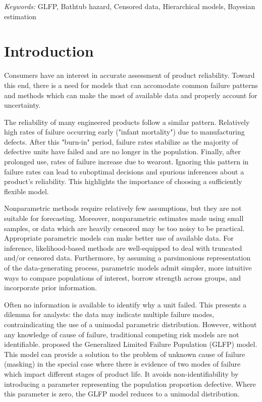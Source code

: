 \documentclass[12pt]{article}
\begin{document}
\noindent%
{\it Keywords:} GLFP, Bathtub hazard, Censored data, Hierarchical models, Bayesian estimation
\vfill

\newpage
\tableofcontents
\newpage
{} %
\section{Introduction}
Consumers have an interest in accurate assessment of product reliability. Toward this end, there is a need for models that can accomodate common failure patterns and methods which can make the most of available data and properly account for uncertainty.

The reliability of many engineered products follow a similar pattern. Relatively high rates of failure occurring early ("infant mortality") due to manufacturing defects.  After this "burn-in" period, failure rates stabilize as the majority of defective units have failed and are no longer in the population.  Finally, after prolonged use, rates of failure increase due to wearout.  Ignoring this pattern in failure rates can lead to suboptimal decisions and spurious inferences about a product's reliability. This highlights the importance of choosing a sufficiently flexible model.

Nonparametric methods require relatively few assumptions, but they are not suitable for forecasting. Moreover, nonparametric estimates made using small samples, or data which are heavily censored may be too noisy to be practical. Appropriate parametric models can make better use of available data. For inference, likelihood-based methods are well-equipped to deal with truncated and/or censored data. Furthermore, by assuming a parsimonious representation of the data-generating process, parametric models admit simpler, more intuitive ways to compare populations of interest, borrow strength across groups, and incorporate prior information. 

Often no information is available to identify why a unit failed. This presents a dilemma for analysts: the data may indicate multiple failure modes, contraindicating the use of a unimodal parametric distribution. However, without any knowledge of cause of failure, traditional competing risk models are not identifiable. \citet{chan} proposed the Generalized Limited Failure Population (GLFP) model. This model can provide a solution to the problem of unknown cause of failure (masking) in the special case where there is evidence of two modes of failure which impact different stages of product life. It avoids non-identifiability by introducing a parameter representing the population proportion defective. Where this parameter is zero, the GLFP model reduces to a unimodal distribution. \\
\end{document}
